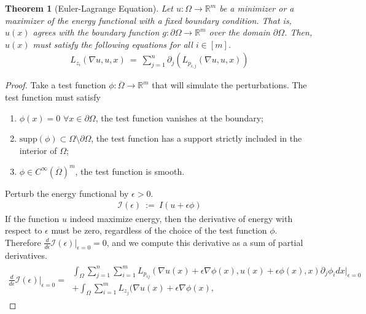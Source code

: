 \documentclass[10pt]{article}
\numberwithin{equation}{section}
\newcommand{\deriv}[2]{
\frac {d {#1} } {d {#2}}
}
\newtheorem{theorem}{Theorem}
\numberwithin{theorem}{section}
\numberwithin{proposition}{section}
\numberwithin{lemma}{section}
\numberwithin{corollary}{section}
\numberwithin{remark}{section}
\numberwithin{definition}{section}
\numberwithin{example}{section}
\numberwithin{conjecture}{section}
\numberwithin{question}{section}
\begin{document}
\begin{theorem}[Euler-Lagrange Equation]
    Let $u:\Omega \rightarrow \mathbb R^m$ be a minimizer or a maximizer 
    of the energy functional with a fixed boundary condition. That is, 
    $u(x)$ agrees with the boundary function $g: \partial\Omega \rightarrow \mathbb R^m$ 
    over the domain $\partial \Omega$. 
    Then, $u(x)$ must satisfy the following equations for all $i \in [m]$. 
    \begin{align}
        L_{z_i}(\nabla u, u, x)  \ = \ \sum_{j = 1}^n \partial_j\left(L_{p_{i,j}}(\nabla u, u, x)\right)
    \end{align}
\end{theorem}

\begin{proof}
    Take a test function $\phi: \overline\Omega \rightarrow \mathbb R^m$ that will simulate 
    the perturbations. The test function must satisfy 
    \begin{enumerate}
        \item $\phi(x) = 0$  $\forall x \in \partial \Omega$, the test function vanishes at the boundary; 
        \item $\text{supp}(\phi) \subset \Omega \setminus \partial \Omega$, the test function has a support strictly included in the interior of $\Omega$; 
        \item $\phi \in C^\infty(\overline\Omega)^m$, the test function is smooth. 
    \end{enumerate}
    Perturb the energy functional by $\epsilon > 0$. 
    \begin{align}
        \mathcal I(\epsilon) \ := \ I(u + \epsilon \phi)
    \end{align}
    If the function $u$ indeed maximize energy, then the derivative of 
    energy with respect to $\epsilon$ must be zero, regardless of the choice 
    of the test function $\phi$. Therefore $\deriv{}{\epsilon}\mathcal I(\epsilon)\bigg|_{\epsilon = 0} = 0$, 
    and we compute this derivative as a sum of partial derivatives. 
    \begin{align}
        \deriv{}{\epsilon}\mathcal I(\epsilon) \bigg|_{\epsilon = 0} = \ 
        \begin{split}
        \int_\Omega \sum_{j = 1}^n \sum_{i = 1}^m L_{p_{ij}}(\nabla u(x) + \epsilon \nabla \phi(x) , 
        u(x) + \epsilon \phi(x), x) \partial_j \phi_i dx\bigg|_{\epsilon = 0} \\ 
        + \int_{\Omega} \sum_{i = 1}^m L_{z_j}(\nabla u(x) + \epsilon \nabla \phi(x) , 

\end{split}
\end{align}
\end{proof}
\end{document}
